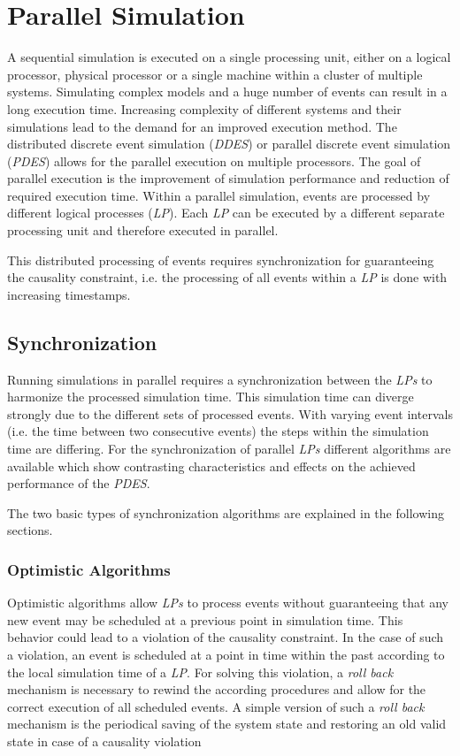 \chapter{Parallel Simulation}
\label{cha:parallel_sim}
A sequential simulation is executed on a single processing unit, either on a logical processor, physical processor or a single machine within a cluster of multiple systems.
Simulating complex models and a huge number of events can result in a long execution time.
Increasing complexity of different systems and their simulations lead to the demand for an improved execution method.
The distributed discrete event simulation (\emph{DDES}) or parallel discrete event simulation (\emph{PDES}) allows for the parallel execution on multiple processors.
The goal of parallel execution is the improvement of simulation performance and reduction of required execution time.
Within a parallel simulation, events are processed by different logical processes (\emph{LP}).
Each \emph{LP} can be executed by a different separate processing unit and therefore executed in parallel. \cite{bagrodia_parsec:_1998}

This distributed processing of events requires synchronization for guaranteeing the causality constraint, i.e. the processing of all events within a \emph{LP} is done with increasing timestamps.

\section{Synchronization}
\label{sec:parallel_synchronization}
Running simulations in parallel requires a synchronization between the \emph{LPs} to harmonize the processed simulation time.
This simulation time can diverge strongly due to the different sets of processed events.
With varying event intervals (i.e. the time between two consecutive events) the steps within the simulation time are differing.
For the synchronization of parallel \emph{LPs} different algorithms are available which show contrasting characteristics and effects on the achieved performance of the \emph{PDES}. \cite[chapter 2]{bagrodia_performance_2000}

The two basic types of synchronization algorithms are explained in the following sections.

\subsection{Optimistic Algorithms}
\label{sec:parallel_synchronization_optimistic}
Optimistic algorithms allow \emph{LPs} to process events without guaranteeing that any new event may be scheduled at a previous point in simulation time.
This behavior could lead to a violation of the causality constraint.
In the case of such a violation, an event is scheduled at a point in time within the past according to the local simulation time of a \emph{LP}.
For solving this violation, a \emph{roll back} mechanism is necessary to rewind the according procedures and allow for the correct execution of all scheduled events.
A simple version of such a \emph{roll back} mechanism is the periodical saving of the system state and restoring an old valid state in case of a causality violation \cite{bagrodia_parsec:_1998}
    
